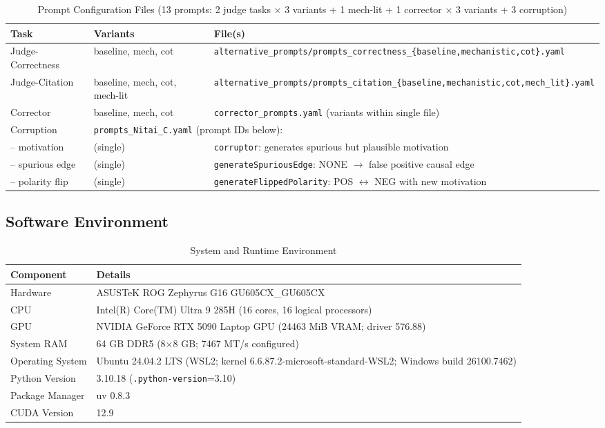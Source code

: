 \begin{table}[H]
\centering
\caption{Prompt Configuration Files (13 prompts: 2 judge tasks $\times$ 3 variants + 1 mech-lit + 1 corrector $\times$ 3 variants + 3 corruption)}
\label{tab:prompt_files}
\footnotesize
\begin{tabularx}{\textwidth}{@{}l l X@{}}
\toprule
\textbf{Task} & \textbf{Variants} & \textbf{File(s)} \\
\midrule
Judge-Correctness & baseline, mech, cot & \texttt{alternative\_prompts/prompts\_correctness\_\{baseline,mechanistic,cot\}.yaml} \\
Judge-Citation & baseline, mech, cot, mech-lit & \texttt{alternative\_prompts/prompts\_citation\_\{baseline,mechanistic,cot,mech\_lit\}.yaml} \\
Corrector & baseline, mech, cot & \texttt{corrector\_prompts.yaml} (variants within single file) \\
\midrule
Corruption & \multicolumn{2}{l}{\texttt{prompts\_Nitai\_C.yaml} (prompt IDs below):} \\
\quad -- motivation & (single) & \texttt{corruptor}: generates spurious but plausible motivation \\
\quad -- spurious edge & (single) & \texttt{generateSpuriousEdge}: NONE $\rightarrow$ false positive causal edge \\
\quad -- polarity flip & (single) & \texttt{generateFlippedPolarity}: POS $\leftrightarrow$ NEG with new motivation \\
\bottomrule
\end{tabularx}
\end{table}

\subsection{Software Environment}
\label{sec:software_env}

\begin{table}[H]
\centering
\caption{System and Runtime Environment}
\label{tab:system_env}
\footnotesize
\begin{tabular}{@{}ll@{}}
\toprule
\textbf{Component} & \textbf{Details} \\
\midrule
Hardware & ASUSTeK ROG Zephyrus G16 GU605CX\_GU605CX \\
CPU & Intel(R) Core(TM) Ultra 9 285H (16 cores, 16 logical processors) \\
GPU & NVIDIA GeForce RTX 5090 Laptop GPU (24463 MiB VRAM; driver 576.88) \\
System RAM & 64 GB DDR5 (8$\times$8 GB; 7467 MT/s configured) \\
Operating System & Ubuntu 24.04.2 LTS (WSL2; kernel 6.6.87.2-microsoft-standard-WSL2; Windows build 26100.7462) \\
Python Version & 3.10.18 (\texttt{.python-version}=3.10) \\
Package Manager & uv 0.8.3 \\
CUDA Version & 12.9 \\
\bottomrule
\end{tabular}
\end{table}

